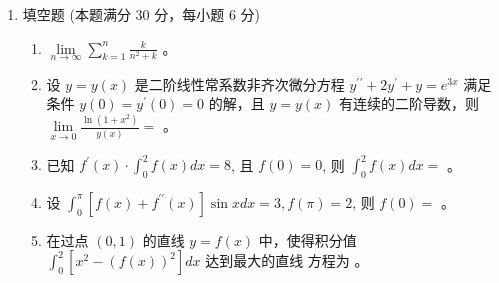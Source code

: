 

\begin{enumerate}
	\item
填空题 (本题满分 30 分，每小题 6 分)	
\begin{enumerate}
	\item
 $\lim\limits _{n \rightarrow \infty} \sum\limits_{k=1}^{n} \frac{k}{n^{2}+k}$  。


\item
设 $y=y(x)$ 是二阶线性常系数非齐次微分方程 $y^{\prime \prime}+2 y^{\prime}+y=e^{3 x}$ 满足条件 $y(0)=y^{\prime}(0)=0$
的解，且 $y=y(x)$ 有连续的二阶导数，则 $\lim\limits _{x \rightarrow 0} \frac{\ln \left(1+x^{2}\right)}{y(x)}=$  。


\item
已知 $f^{\prime}(x) \cdot \int_{0}^{2} f(x) d x=8$, 且 $f(0)=0$, 则 $\int_{0}^{2} f(x) d x=$  。


\item
设 $\int_{0}^{\pi}\left[f(x)+f^{\prime \prime}(x)\right] \sin x d x=3, f(\pi)=2$, 则 $f(0)=$  。


\item
在过点 $(0,1)$ 的直线 $y=f(x)$ 中，使得积分值 $\int_{0}^{2}\left[x^{2}-(f(x))^{2}\right] d x$ 达到最大的直线 方程为  。
	
	
	
	
\end{enumerate}


\end{enumerate}
